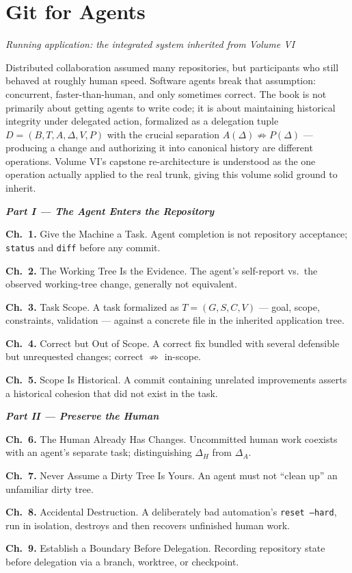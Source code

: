 \documentclass[11pt]{book}
\newcommand{\subheading}[1]{\bigskip\noindent{\bfseries\itshape #1}\smallskip\par}
\newcommand{\chapentry}[2]{\noindent\textbf{Ch.~#1.} #2\par\smallskip}
\newcommand{\partheading}[1]{\bigskip\noindent\textbf{\textit{#1}}\smallskip\par}
\begin{document}
\chapter{Git for Agents}
\textit{Running application: the integrated system inherited from Volume VI}

\subheading{Governing Idea}
Distributed collaboration assumed many repositories, but participants who still behaved at roughly human speed. Software agents break that assumption: concurrent, faster-than-human, and only sometimes correct. The book is not primarily about getting agents to write code; it is about maintaining historical integrity under delegated action, formalized as a delegation tuple $D=(B,T,A,\Delta,V,P)$ with the crucial separation $A(\Delta) \not\Rightarrow P(\Delta)$ --- producing a change and authorizing it into canonical history are different operations. Volume VI's capstone re-architecture is understood as the one operation actually applied to the real trunk, giving this volume solid ground to inherit.

\subheading{Chapter Outline}

\partheading{Part I --- The Agent Enters the Repository}
\chapentry{1}{Give the Machine a Task. Agent completion is not repository acceptance; \texttt{status} and \texttt{diff} before any commit.}
\chapentry{2}{The Working Tree Is the Evidence. The agent's self-report vs.\ the observed working-tree change, generally not equivalent.}
\chapentry{3}{Task Scope. A task formalized as $T=(G,S,C,V)$ --- goal, scope, constraints, validation --- against a concrete file in the inherited application tree.}
\chapentry{4}{Correct but Out of Scope. A correct fix bundled with several defensible but unrequested changes; correct $\not\Rightarrow$ in-scope.}
\chapentry{5}{Scope Is Historical. A commit containing unrelated improvements asserts a historical cohesion that did not exist in the task.}

\partheading{Part II --- Preserve the Human}
\chapentry{6}{The Human Already Has Changes. Uncommitted human work coexists with an agent's separate task; distinguishing $\Delta_H$ from $\Delta_A$.}
\chapentry{7}{Never Assume a Dirty Tree Is Yours. An agent must not ``clean up'' an unfamiliar dirty tree.}
\chapentry{8}{Accidental Destruction. A deliberately bad automation's \texttt{reset --hard}, run in isolation, destroys and then recovers unfinished human work.}
\chapentry{9}{Establish a Boundary Before Delegation. Recording repository state before delegation via a branch, worktree, or checkpoint.}
\end{document}
